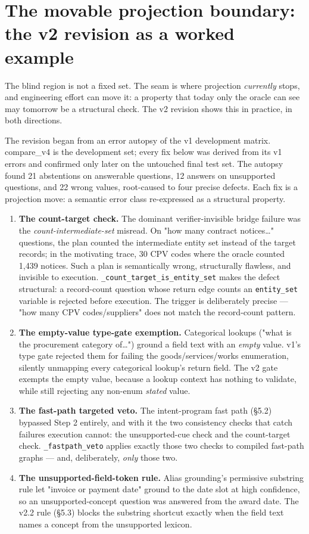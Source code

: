 \documentclass[10pt]{article} %
\begin{document}
\section{The movable projection boundary: the v2 revision as a worked example}\label{sec:the-movable-projection-boundary-the-v2-r}

The blind region is not a fixed set. The seam is where projection \emph{currently} stops, and engineering effort can move it: a property that today only the oracle can see may tomorrow be a structural check. The v2 revision shows this in practice, in both directions.

The revision began from an error autopsy of the v1 development matrix. compare\_v4 is the development set; every fix below was derived from its v1 errors and confirmed only later on the untouched final test set. The autopsy found 21 abstentions on answerable questions, 12 answers on unsupported questions, and 22 wrong values, root-caused to four precise defects. Each fix is a projection move: a semantic error class re-expressed as a structural property.

\begin{enumerate}
\item \textbf{The count-target check.} The dominant verifier-invisible bridge failure was the \emph{count-intermediate-set} misread. On "how many contract notices\ldots{}" questions, the plan counted the intermediate entity set instead of the target records; in the motivating trace, 30 CPV codes where the oracle counted 1,439 notices. Such a plan is semantically wrong, structurally flawless, and invisible to execution. \texttt{\_count\_target\_is\_entity\_set} makes the defect structural: a record-count question whose return edge counts an \texttt{entity\_set} variable is rejected before execution. The trigger is deliberately precise --- "how many CPV codes/suppliers" does not match the record-count pattern.
\item \textbf{The empty-value type-gate exemption.} Categorical lookups ("what is the procurement category of\ldots{}") ground a field text with an \emph{empty} value. v1's type gate rejected them for failing the goods/services/works enumeration, silently unmapping every categorical lookup's return field. The v2 gate exempts the empty value, because a lookup context has nothing to validate, while still rejecting any non-enum \emph{stated} value.
\item \textbf{The fast-path targeted veto.} The intent-program fast path (\S5.2) bypassed Step 2 entirely, and with it the two consistency checks that catch failures execution cannot: the unsupported-cue check and the count-target check. \texttt{\_fastpath\_veto} applies exactly those two checks to compiled fast-path graphs --- and, deliberately, \emph{only} those two.
\item \textbf{The unsupported-field-token rule.} Alias grounding's permissive substring rule let "invoice or payment date" ground to the date slot at high confidence, so an unsupported-concept question was answered from the award date. The v2.2 rule (\S5.3) blocks the substring shortcut exactly when the field text names a concept from the unsupported lexicon.
\end{enumerate}
\end{document}
